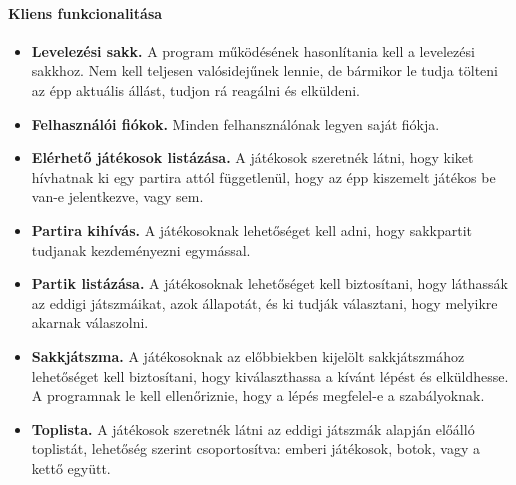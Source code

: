 \documentclass[twoside, a4paper, 12pt]{article}
\begin{document}
\paragraph{Kliens funkcionalitása}
\begin{itemize}
	\item \textbf{Levelezési sakk.} A program működésének hasonlítania kell a levelezési sakkhoz. Nem kell teljesen valósidejűnek lennie, de bármikor le tudja tölteni az épp aktuális állást, tudjon rá reagálni és elküldeni.
	
	\item \textbf{Felhasználói fiókok.} Minden felhansználónak legyen saját fiókja.
	
	\item \textbf{Elérhető játékosok listázása.} A játékosok szeretnék látni, hogy kiket hívhatnak ki egy partira attól függetlenül, hogy az épp kiszemelt játékos be van-e jelentkezve, vagy sem.
	
	\item \textbf{Partira kihívás.} A játékosoknak lehetőséget kell adni, hogy sakkpartit tudjanak kezdeményezni egymással.
	
	\item \textbf{Partik listázása.} A játékosoknak lehetőséget kell biztosítani, hogy láthassák az eddigi játszmáikat, azok állapotát, és ki tudják választani, hogy melyikre akarnak válaszolni.
	
	\item \textbf{Sakkjátszma.} A játékosoknak az előbbiekben kijelölt sakkjátszmához lehetőséget kell biztosítani, hogy kiválaszthassa a kívánt lépést és elküldhesse. A programnak le kell ellenőriznie, hogy a lépés megfelel-e a szabályoknak.
	
	\item \textbf{Toplista.} A játékosok szeretnék látni az eddigi játszmák alapján előálló toplistát, lehetőség szerint csoportosítva: emberi játékosok, botok, vagy a kettő együtt.
\end{itemize}

\end{document}
